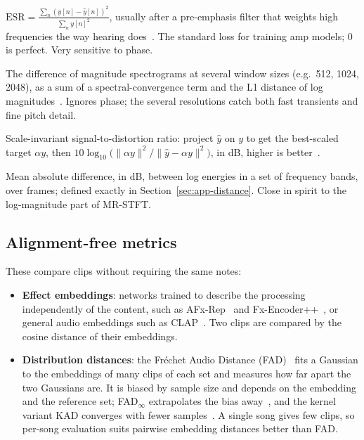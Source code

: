 \begin{description}[style=nextline,leftmargin=1.2cm]
\item[Error-to-signal ratio (ESR)]
  $\displaystyle \mathrm{ESR} = \frac{\sum_n (y[n]-\hat y[n])^2}{\sum_n y[n]^2}$,
  usually after a pre-emphasis filter that weights high frequencies the way
  hearing does~\cite{wright2020perceptual}. The standard loss for training amp
  models; 0 is perfect. Very sensitive to phase.
\item[Multi-resolution STFT distance (MR-STFT)] The difference of magnitude
  spectrograms at several window sizes (e.g.\ 512, 1024, 2048), as a sum of a
  spectral-convergence term and the L1 distance of log
  magnitudes~\cite{yamamoto2020parallel,steinmetz2020auraloss}. Ignores phase;
  the several resolutions catch both fast transients and fine pitch detail.
\item[SI-SDR] Scale-invariant signal-to-distortion ratio: project $\hat y$ on
  $y$ to get the best-scaled target $\alpha y$, then
  $10\log_{10}\bigl(\|\alpha y\|^2/\|\hat y - \alpha y\|^2\bigr)$, in dB, higher
  is better~\cite{leroux2019sdr}.
\item[Log-band distance (the app's)] Mean absolute difference, in dB, between
  log energies in a set of frequency bands, over frames; defined exactly in
  Section~\ref{sec:app-distance}. Close in spirit to the log-magnitude part of
  MR-STFT.
\end{description}

\subsection{Alignment-free metrics}

These compare clips without requiring the same notes:
\begin{itemize}
\item \textbf{Effect embeddings}: networks trained to describe the processing
  independently of the content, such as AFx-Rep~\cite{steinmetz2024stito} and
  Fx-Encoder++~\cite{yeh2025fxencoder}, or general audio embeddings such as
  CLAP~\cite{wu2023laionclap}. Two clips are compared by the cosine distance of
  their embeddings.
\item \textbf{Distribution distances}: the Fréchet Audio Distance
  (FAD)~\cite{kilgour2019fad} fits a Gaussian to the embeddings of many clips of
  each set and measures how far apart the two Gaussians are. It is biased by
  sample size and depends on the embedding and the reference set; FAD$_\infty$
  extrapolates the bias away~\cite{gui2024adapting}, and the kernel variant KAD
  converges with fewer samples~\cite{chung2025kad}. A single song gives few clips,
  so per-song evaluation suits pairwise embedding distances better than FAD.
\end{itemize}

